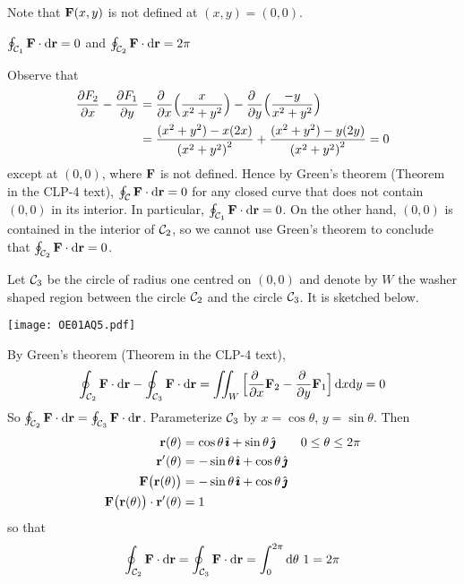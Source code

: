 \begin{hint} 
Note that $\mathbf{F}(x,y)$ is not defined at $(x,y)=(0,0)$.
\end{hint}

\begin{answer} 
$\oint_{\mathcal{C}_1}\mathbf{F}\cdot \mathrm{d}\mathbf{r}=0$ and $\oint_{\mathcal{C}_2}\mathbf{F}\cdot \mathrm{d}\mathbf{r}=2\pi$
\end{answer}

\begin{solution} 
Observe that
\begin{align*}
\frac{\partial F_2}{\partial x}
-\frac{\partial F_1}{\partial y}
&=\frac{\partial \hfill}{\partial x}\Big( \frac{x}{x^2+y^2}\Big)
-\frac{\partial \hfill}{\partial y}\Big( \frac{-y}{x^2+y^2}\Big)\\
&=\frac{(x^2+y^2)-x(2x)}{{(x^2+y^2)}^2}
+\frac{(x^2+y^2)-y(2y)}{{(x^2+y^2)}^2}=0
\end{align*}
except at $(0,0)$, where $\mathbf{F}$ is not defined. Hence by Green's theorem
(Theorem  in the CLP-4 text),
$\oint_{\mathcal{C}}\mathbf{F}\cdot \mathrm{d}\mathbf{r}=0$ for any closed curve that does not contain
$(0,0)$ in its interior. 
In particular, $\oint_{\mathcal{C}_1}\mathbf{F}\cdot \mathrm{d}\mathbf{r}=0$. On the other hand,
$(0,0)$ is contained in the interior of $\mathcal{C}_2$, so we cannot use
Green's theorem to conclude that $\oint_{\mathcal{C}_2}\mathbf{F}\cdot \mathrm{d}\mathbf{r}=0$.

Let $\mathcal{C}_3$ be the circle of radius one centred on $(0,0)$ and
denote by $W$ the washer shaped region between the circle
$\mathcal{C}_2$ and the circle $\mathcal{C}_3$. It is sketched below.

\begin{center}
   \texttt{[image: OE01AQ5.pdf]}
\end{center}

 By Green's theorem (Theorem  in the CLP-4 text),
\begin{align*}
\oint_{\cC_2}\vF\cdot \dee{\vr}-\oint_{\cC_3}\vF\cdot \dee{\vr}
=\dblInt_W \Big[\pdiff{}{x}\vF_2
-\pdiff{}{y}\vF_1\Big]\,\dee{x}\dee{y}
=0
\end{align*} 
So
$\oint_{\mathcal{C}_2}\mathbf{F}\cdot \mathrm{d}\mathbf{r}=\oint_{\mathcal{C}_3}\mathbf{F}\cdot \mathrm{d}\mathbf{r}$. Parameterize
$\mathcal{C}_3$ by $x=\cos\theta$, $y=\sin\theta$. Then
\begin{align*}
\mathbf{r}(\theta)&=\cos\theta\,\hat{\pmb{\imath}}+\sin\theta\,\hat{\pmb{\jmath}}\qquad 0\le \theta\le 2\pi\\
\mathbf{r}'(\theta)&=-\sin\theta\,\hat{\pmb{\imath}}+\cos\theta\,\hat{\pmb{\jmath}}\\
\mathbf{F}\big(\mathbf{r}(\theta)\big)&=-\sin\theta\,\hat{\pmb{\imath}}+\cos\theta\,\hat{\pmb{\jmath}}\\
\mathbf{F}\big(\mathbf{r}(\theta)\big)\cdot\mathbf{r}'(\theta)
&=1\\
\end{align*}
so that
$$
\oint_{\mathcal{C}_2}\mathbf{F}\cdot \mathrm{d}\mathbf{r}
=\oint_{\mathcal{C}_3}\mathbf{F}\cdot \mathrm{d}\mathbf{r}
=\int_0^{2\pi} \mathrm{d}\theta\ 1
=2\pi
$$
\end{solution}

